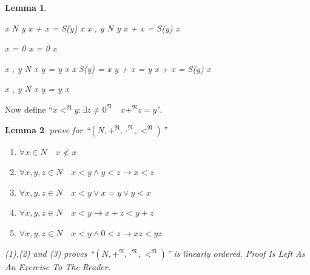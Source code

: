 \documentclass[10pt,a4paper]{book}
\newtheorem{lemma}{Lemma}[section]
\begin{document}
\begin{lemma}
\begin{fitchproof}[arrayenv=tabular]
         {\forall x  \in N \quad y x + x = S(y) \cdot x  }     
        \close
         {\forall x , y \in N \quad y x + x = S(y) \cdot x  }     

    \end{fitchproof}

    \begin{fitchproof}[arrayenv=tabular]

         {  x   = 0  }                 
         {  x    = 0 \cdot  x }                 
        
        \open
         { x , y   \in N }   
        \open
         { x   y = y  x }     
         { x  \cdot S(y) = x y + x =  y x + x   = S(y) \cdot x }        
        \close

        \close
         {\forall x , y \in N \quad x   y = y  x  }     

    \end{fitchproof}

\end{lemma}

Now define ``$ x <^{\mathfrak{N}} y : \exists z \not=0^{\mathfrak{N}} \quad x +^{\mathfrak{N}} z = y $''.


\begin{lemma}prove for ``$(N , +^{\mathfrak{N}} , \cdot^{\mathfrak{N}} , <^{\mathfrak{N}} )$''
    \begin{enumerate}
        \setlength{\itemsep}{0pt} %
        \item       $\forall x  \in N \quad x \not< x  $
        \item       $\forall x , y , z \in N \quad x < y \land y < z  \to   x <  z   $
        \item       $\forall x , y , z \in N \quad x < y \lor x =  y  \lor   y <  x   $
        \item       $\forall x , y , z \in N \quad x < y \to x + z < y + z  $
        \item       $\forall x , y , z \in N \quad x < y \land 0 < z \to x z < y z  $
    \end{enumerate}
    (1),(2) and  (3) proves ``$(N , +^{\mathfrak{N}} , \cdot^{\mathfrak{N}} , <^{\mathfrak{N}})$'' is linearly ordered.
    Proof Is Left As An Exercise To The Reader.
\end{lemma}
\end{document}
